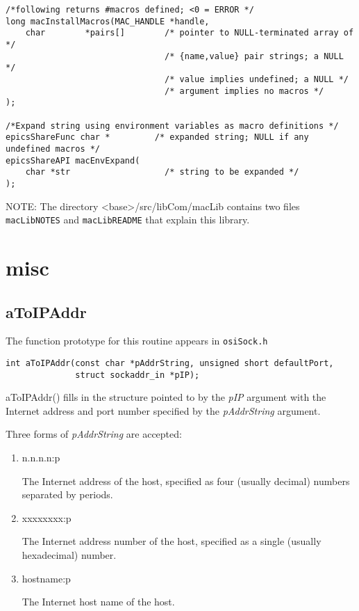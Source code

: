 \begin{verbatim}
/*following returns #macros defined; <0 = ERROR */
long macInstallMacros(MAC_HANDLE *handle,
    char        *pairs[]        /* pointer to NULL-terminated array of */
                                /* {name,value} pair strings; a NULL */
                                /* value implies undefined; a NULL */
                                /* argument implies no macros */
);

/*Expand string using environment variables as macro definitions */
epicsShareFunc char *         /* expanded string; NULL if any undefined macros */
epicsShareAPI macEnvExpand(
    char *str                   /* string to be expanded */
);
\end{verbatim}

NOTE: The directory \textless{}base\textgreater{}/src/libCom/macLib contains two files \verb|macLibNOTES| and \verb|macLibREADME| that explain this library.

\section{misc}

\subsection{aToIPAddr}

The function prototype for this routine appears in \verb|osiSock.h|

\begin{verbatim}
int aToIPAddr(const char *pAddrString, unsigned short defaultPort,
              struct sockaddr_in *pIP);
\end{verbatim}

aToIPAddr() fills in the structure pointed to by the \emph{pIP} argument with the Internet address and port number specified by the \emph{pAddrString} argument.

Three forms of \emph{pAddrString} are accepted:

\begin{enumerate}
\item n.n.n.n:p

The Internet address of the host, specified as four (usually decimal) numbers separated by periods.

\item xxxxxxxx:p

The Internet address number of the host, specified as a single (usually hexadecimal) number.

\item hostname:p

The Internet host name of the host.

\end{enumerate}

